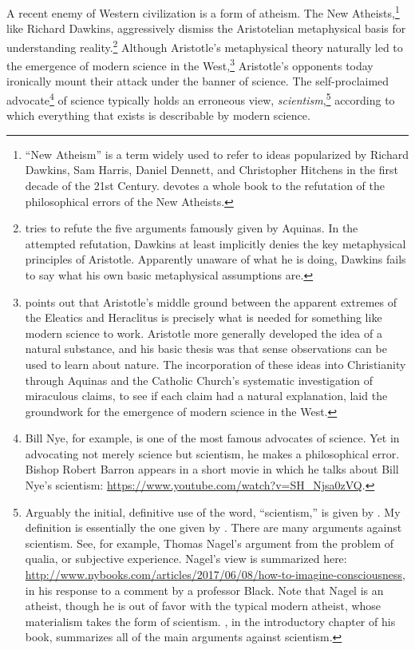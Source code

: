 \documentclass[twocolumn]{article}
\begin{document}
A recent enemy of Western civilization is a form of atheism.  The New
Atheists,\footnote{%
   ``New Atheism'' is a term widely used to refer to ideas popularized by
   Richard Dawkins, Sam Harris, Daniel Dennett, and Christopher Hitchens in the
   first decade of the 21st Century.  \cite{f2008} devotes a whole book to the
   refutation of the philosophical errors of the New Atheists.
}
like Richard Dawkins, aggressively dismiss the Aristotelian metaphysical basis
for understanding reality.\footnote{%
   \citet[Chapter 3]{d2006} tries to refute the five arguments famously given
   by Aquinas.  In the attempted refutation, Dawkins at least implicitly denies
   the key metaphysical principles of Aristotle.  Apparently unaware of what he
   is doing, Dawkins fails to say what his own basic metaphysical assumptions
   are.
}
Although Aristotle's metaphysical theory naturally led to the emergence of
modern science in the West,\footnote{%
   \citet[Page 36]{f2014} points out that Aristotle's middle ground between the
   apparent extremes of the Eleatics and Heraclitus is precisely what is needed
   for something like modern science to work.  Aristotle more generally
   \citep[Pages 164--171]{f2014} developed the idea of a natural substance, and
   his basic thesis was that sense observations can be used to learn about
   nature.  The incorporation of these ideas into Christianity through Aquinas
   and the Catholic Church's systematic investigation of miraculous claims, to
   see if each claim had a natural explanation, laid the groundwork for the
   emergence of modern science in the West.
}
Aristotle's opponents today ironically mount their attack under the banner of
science.  The self-proclaimed advocate\footnote{%
   Bill Nye, for example, is one of the most famous advocates of science.  Yet
   in advocating not merely science but scientism, he makes a philosophical
   error.  Bishop Robert Barron appears in a short movie in which he talks
   about Bill Nye's scientism:
   \url{https://www.youtube.com/watch?v=SH_Njsa0zVQ}.%
}
of science typically holds an erroneous view, \emph{scientism},\footnote{%
   Arguably the initial, definitive use of the word, ``scientism,'' is given by
   \cite{s1991}.  My definition is essentially the one given by \cite{h2011}.
   There are many arguments against scientism.  See, for example, Thomas
   Nagel's argument from the problem of qualia, or subjective experience.
   Nagel's view is summarized here:
   \url{http://www.nybooks.com/articles/2017/06/08/how-to-imagine-consciousness},
   in his response to a comment by a professor Black.  Note that Nagel is an
   atheist, though he is out of favor with the typical modern atheist, whose
   materialism takes the form of scientism.  \cite{f2014}, in the introductory
   chapter of his book, summarizes all of the main arguments against
   scientism.%
}
according to which everything that exists is describable by modern science.
\end{document}

